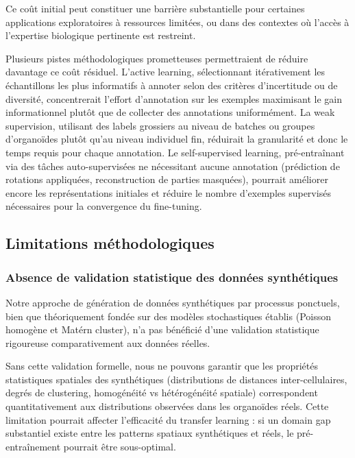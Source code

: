 Ce coût initial peut constituer une barrière substantielle pour certaines applications exploratoires à ressources limitées, ou dans des contextes où l'accès à l'expertise biologique pertinente est restreint.

Plusieurs pistes méthodologiques prometteuses permettraient de réduire davantage ce coût résiduel. L'active learning, sélectionnant itérativement les échantillons les plus informatifs à annoter selon des critères d'incertitude ou de diversité, concentrerait l'effort d'annotation sur les exemples maximisant le gain informationnel plutôt que de collecter des annotations uniformément. La weak supervision, utilisant des labels grossiers au niveau de batches ou groupes d'organoïdes plutôt qu'au niveau individuel fin, réduirait la granularité et donc le temps requis pour chaque annotation. Le self-supervised learning, pré-entraînant via des tâches auto-supervisées ne nécessitant aucune annotation (prédiction de rotations appliquées, reconstruction de parties masquées), pourrait améliorer encore les représentations initiales et réduire le nombre d'exemples supervisés nécessaires pour la convergence du fine-tuning.

\subsection{Limitations méthodologiques}

\subsubsection{Absence de validation statistique des données synthétiques}

Notre approche de génération de données synthétiques par processus ponctuels, bien que théoriquement fondée sur des modèles stochastiques établis (Poisson homogène et Matérn cluster), n'a pas bénéficié d'une validation statistique rigoureuse comparativement aux données réelles. 

Sans cette validation formelle, nous ne pouvons garantir que les propriétés statistiques spatiales des synthétiques (distributions de distances inter-cellulaires, degrés de clustering, homogénéité vs hétérogénéité spatiale) correspondent quantitativement aux distributions observées dans les organoïdes réels. Cette limitation pourrait affecter l'efficacité du transfer learning : si un domain gap substantiel existe entre les patterns spatiaux synthétiques et réels, le pré-entraînement pourrait être sous-optimal.


